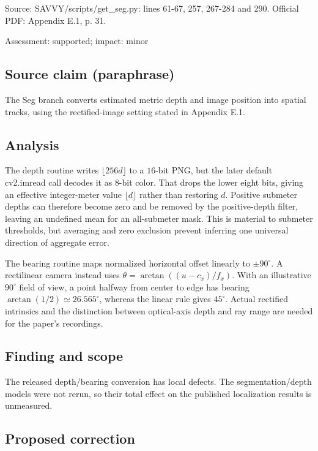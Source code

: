 \documentclass[11pt]{article}
\begin{document}
Source: SAVVY/scripts/get\_seg.py: lines 61-67, 257, 267-284 and 290. Official PDF: Appendix E.1, p. 31.

Assessment: supported; impact: minor

\subsection*{Source claim (paraphrase)}

The Seg branch converts estimated metric depth and image position into spatial tracks, using the rectified-image setting stated in Appendix E.1.

\subsection*{Analysis}

The depth routine writes \(\lfloor256d\rfloor\) to a \(16\)-bit PNG, but the later default cv2.imread call decodes it as \(8\)-bit color. That drops the lower eight bits, giving an effective integer-meter value \(\lfloor d\rfloor\) rather than restoring \(d\). Positive submeter depths can therefore become zero and be removed by the positive-depth filter, leaving an undefined mean for an all-submeter mask. This is material to submeter thresholds, but averaging and zero exclusion prevent inferring one universal direction of aggregate error.

The bearing routine maps normalized horizontal offset linearly to \(\pm90^\circ\). A rectilinear camera instead uses \(\theta=\arctan((u-c_x)/f_x)\). With an illustrative \(90^\circ\) field of view, a point halfway from center to edge has bearing \(\arctan(1/2)\simeq26.565^\circ\), whereas the linear rule gives \(45^\circ\). Actual rectified intrinsics and the distinction between optical-axis depth and ray range are needed for the paper's recordings.

\subsection*{Finding and scope}

The released depth/bearing conversion has local defects. The segmentation/depth models were not rerun, so their total effect on the published localization results is unmeasured.

\subsection*{Proposed correction}
\end{document}

